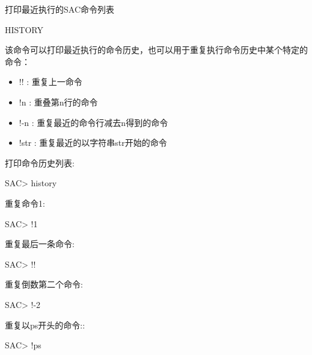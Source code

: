 \label{cmd:history}

打印最近执行的SAC命令列表

\begin{SACSTX}
HISTORY
\end{SACSTX}

该命令可以打印最近执行的命令历史，也可以用于重复执行命令历史中某个特定的命令：
\begin{itemize}
\item !! : 重复上一命令
\item !n : 重叠第n行的命令
\item !-n : 重复最近的命令行减去n得到的命令
\item !str : 重复最近的以字符串str开始的命令
\end{itemize}

打印命令历史列表:
\begin{SACCode}
SAC> history
\end{SACCode}

重复命令1:
\begin{SACCode}
SAC> !1
\end{SACCode}

重复最后一条命令:
\begin{SACCode}
SAC> !!
\end{SACCode}

重复倒数第二个命令:
\begin{SACCode}
SAC> !-2
\end{SACCode}

重复以ps开头的命令::
\begin{SACCode}
SAC> !ps
\end{SACCode}
